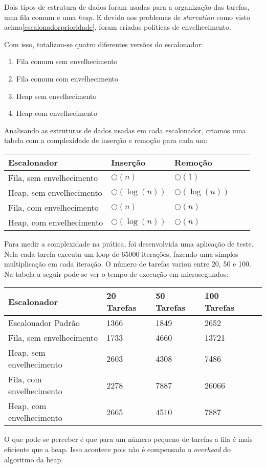 \documentclass[a4paper,onecolumn, 10pt]{article}
\begin{document}
Dois tipos de estrutura de dados foram usadas para a organização das tarefas, uma fila comum e uma \textit{heap}. E devido
aos problemas de \textit{starvation} como visto acima\ref{escalonadorprioridade}, foram criadas políticas de
envelhecimento. 

Com isso, totalizou-se quatro diferentes versões do escalonador:
\begin{enumerate}
    \item Fila comum sem envelhecimento
    \item Fila comum com envelhecimento
    \item Heap sem envelhecimento
    \item Heap com envelhecimento
\end{enumerate}
Analisando as estruturas de dados usadas em cada escalonador, criamos uma tabela com a complexidade de inserção e
remoção para cada um:
\begin{center}
    \begin{tabular}{ | l | l | l | l | p{5cm} |}
    \hline
    Escalonador & Inserção & Remoção \\ \hline
    Fila, sem envelhecimento & $\bigcirc(n)$ & $\bigcirc(1)$ \\ \hline 
    Heap, sem envelhecimento & $\bigcirc(\log(n))$ & $\bigcirc(\log(n))$ \\ \hline
    Fila, com envelhecimento & $\bigcirc(n)$ & $\bigcirc(n)$ \\ \hline
    Heap, com envelhecimento & $\bigcirc(\log(n))$ & $\bigcirc(n)$ \\ \hline
    \end{tabular}
\end{center}
Para medir a complexidade na prática, foi desenvolvida uma aplicação de teste. Nela cada tarefa executa um loop de 65000
iterações, fazendo uma simples multiplicação em cada iteração. O número de tarefas variou entre 20, 50 e 100.
Na tabela a seguir pode-se ver o tempo de execução em microsegundos:
\begin{center}
    \begin{tabular}{ | l | l | l | l | p{5cm} |}
    \hline
    Escalonador              & 20 Tarefas & 50 Tarefas & 100 Tarefas \\ \hline
    Escalonador Padrão       & 1366 & 1849 & 2652 \\ \hline 
    Fila, sem envelhecimento & 1733 & 4660 & 13721 \\ \hline 
    Heap, sem envelhecimento & 2603 & 4308 & 7486 \\ \hline
    Fila, com envelhecimento & 2278 & 7887 & 26066 \\ \hline
    Heap, com envelhecimento & 2665 & 4510 & 7887 \\ \hline
    \end{tabular}
\end{center}
O que pode-se perceber é que para um número pequeno de tarefas a fila é mais eficiente que a heap. Isso acontece pois
não é compensado o \textit{overhead} do algoritmo da heap.
\end{document}
